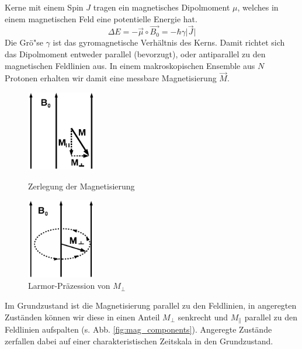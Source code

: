 \documentclass[a4paper]{scrartcl} %
\begin{document}
Kerne mit einem Spin $J$ tragen ein magnetisches Dipolmoment $\mu$, welches in einem magnetischen Feld eine potentielle Energie hat.
\begin{equation}
	\Delta E = - \vec{\mu} \circ \vec{B_0} = - \hbar \gamma \lvert \vec{J} \rvert
\end{equation}
Die Grö"se $\gamma$ ist das gyromagnetische Verhältnis des Kerns. Damit richtet sich das Dipolmoment entweder parallel (bevorzugt), oder antiparallel zu den magnetischen Feldlinien aus. In einem makroskopischen Ensemble aus $N$ Protonen erhalten wir damit eine messbare Magnetisierung $\vec{M}$.
\begin{figure}[H]
	\centering
	\parbox{70mm}{
		\centering
		\includegraphics[height=35mm]{./Resources/magnetization_components.png}
		\caption{Zerlegung der Magnetisierung \autocite{skript}}
		\label{fig:mag_components}
	}
	\hspace*{\fill}
	\parbox{70mm}{
		\centering
		\includegraphics[height=35mm]{./Resources/larmor_precession.png}
		\caption{Larmor-Präzession von $M_{\perp}$ \autocite{skript}}
		\label{fig:larmor}
	}
\end{figure}

Im Grundzustand ist die Magnetisierung parallel zu den Feldlinien, in angeregten Zuständen können wir diese in einen Anteil $M_{\perp}$ senkrecht und $M_{\parallel}$ parallel zu den Feldlinien aufspalten (s. Abb. \ref{fig:mag_components}). Angeregte Zustände zerfallen dabei auf einer charakteristischen Zeitskala in den Grundzustand.
\end{document}
